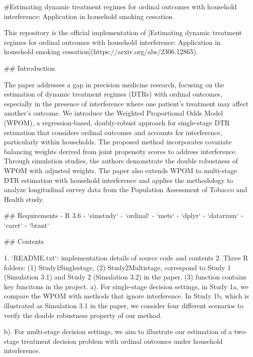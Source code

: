 #Estimating dynamic treatment regimes for ordinal outcomes with household interference: Application in household smoking cessation


This repository is the official implementation of [Estimating dynamic treatment regimes for ordinal outcomes with household interference: Application in household smoking cessation](https://arxiv.org/abs/2306.12865).

## Introduction

The paper addresses a gap in precision medicine research, focusing on the estimation of dynamic treatment regimes (DTRs) with ordinal outcomes, especially in the presence of interference where one patient's treatment may affect another's outcome. We introduce the Weighted Proportional Odds Model (WPOM), a regression-based, doubly-robust approach for single-stage DTR estimation that considers ordinal outcomes and accounts for interference, particularly within households. The proposed method incorporates covariate balancing weights derived from joint propensity scores to address interference. Through simulation studies, the authors demonstrate the double robustness of WPOM with adjusted weights. The paper also extends WPOM to multi-stage DTR estimation with household interference and applies the methodology to analyze longitudinal survey data from the Population Assessment of Tobacco and Health study.

## Requirements
 - R 3.6
 - `simstudy`
 - `ordinal`
 - `mets`
 - `dplyr`
 - `datarium`
 - `caret`
 - `brant`
 
## Contents

  1. `README.txt`: implementation details of source code and contents 
  2. Three R folders: (1) Study1Singlestage, (2) Study2Multistage, correspond to Study 1 (Simulation 3.1) and Study 2 (Simulation 3.2) in the paper. (3) function contains  key funcitons in the project. 
      a). For single-stage decision settings, in Study 1a, we compare the WPOM with methods that ignore interference. In Study 1b, which is illustrated as Simulation 3.1 in the paper, we consider four different scenarios to verify the double robustness property of our method.

      b). For multi-stage decision settings, we aim to illustrate our estimation of a two-stage treatment decision problem with ordinal outcomes under household interference.      

     
 






